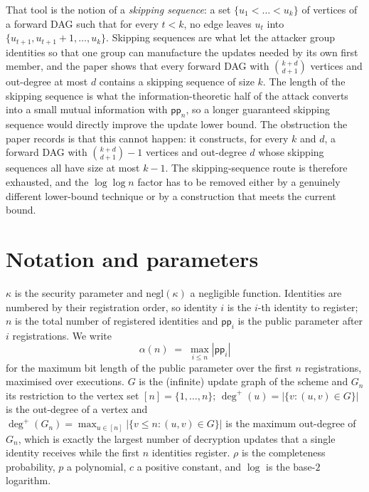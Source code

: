 \documentclass{aicr-conjecture}
\newcommand{\pp}{\mathsf{pp}}
\newcommand{\negl}{\mathrm{negl}}
\newcommand{\outdeg}{\deg^{+}}
\begin{document}
That tool is the notion of a \emph{skipping sequence}: a set
$\{u_1 < \dots < u_k\}$ of vertices of a forward DAG such that for every
$t < k$, no edge leaves $u_t$ into
$\{u_{t+1}, u_{t+1}+1, \dots, u_k\}$. Skipping sequences are what let
the attacker group identities so that one group can manufacture the
updates needed by its own first member, and the paper shows that every
forward DAG with $\binom{k+d}{d+1}$ vertices and out-degree at most $d$
contains a skipping sequence of size $k$. The length of the skipping
sequence is what the information-theoretic half of the attack converts
into a small mutual information with $\pp_n$, so a longer guaranteed
skipping sequence would directly improve the update lower bound. The
obstruction the paper records is that this cannot happen: it constructs,
for every $k$ and $d$, a forward DAG with $\binom{k+d}{d+1}-1$ vertices
and out-degree $d$ whose skipping sequences all have size at most
$k-1$. The skipping-sequence route is therefore exhausted, and the
$\log\log n$ factor has to be removed either by a genuinely different
lower-bound technique or by a construction that meets the current
bound.

\section{Notation and parameters}\label{sec:notation}

\noindent
$\kappa$ is the security parameter and $\negl(\kappa)$ a negligible
function. Identities are numbered by their registration order, so
identity $i$ is the $i$-th identity to register; $n$ is the total number
of registered identities and $\pp_i$ is the public parameter after $i$
registrations. We write
\[
  \alpha(n) \;=\; \max_{i \le n} |\pp_i|
\]
for the maximum bit length of the public parameter over the first $n$
registrations, maximised over executions. $G$ is the (infinite) update
graph of the scheme and $G_n$ its restriction to the vertex set
$[n] = \{1,\dots,n\}$; $\outdeg(u) = |\{v : (u,v) \in G\}|$ is the
out-degree of a vertex and
$\outdeg(G_n) = \max_{u \in [n]} |\{v \le n : (u,v) \in G\}|$ is the
maximum out-degree of $G_n$, which is exactly the largest number of
decryption updates that a single identity receives while the first $n$
identities register. $\rho$ is the completeness probability, $p$ a
polynomial, $c$ a positive constant, and $\log$ is the base-$2$
logarithm.
\end{document}

